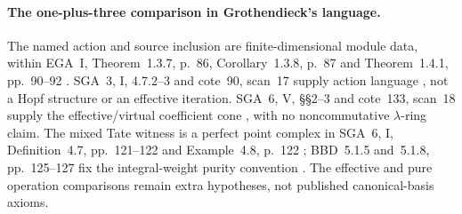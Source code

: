\paragraph{The  one-plus-three comparison in Grothendieck's language.}
The named action and source inclusion are
finite-dimensional module data, within
EGA~I, Theorem~1.3.7, p.~86,
Corollary~1.3.8, p.~87 and
Theorem~1.4.1, pp.~90--92 \cite{EGA}.
SGA~3, I, 4.7.2--3 and cote~90, scan~17
supply action language \cite{SGA3,Archive},
not a Hopf structure or an effective iteration.
SGA~6, V, \S\S2--3 and cote~133, scan~18
supply the effective/virtual coefficient cone
\cite{SGA6,Archive}, with no noncommutative
\(\lambda\)-ring claim.
The mixed Tate witness is a perfect point
complex in SGA~6, I, Definition~4.7,
pp.~121--122 and Example~4.8, p.~122
\cite{SGA6}; BBD~5.1.5 and~5.1.8,
pp.~125--127 fix the integral-weight purity
convention \cite{BBD}.
The effective and pure operation comparisons
remain extra hypotheses, not published
canonical-basis axioms.
